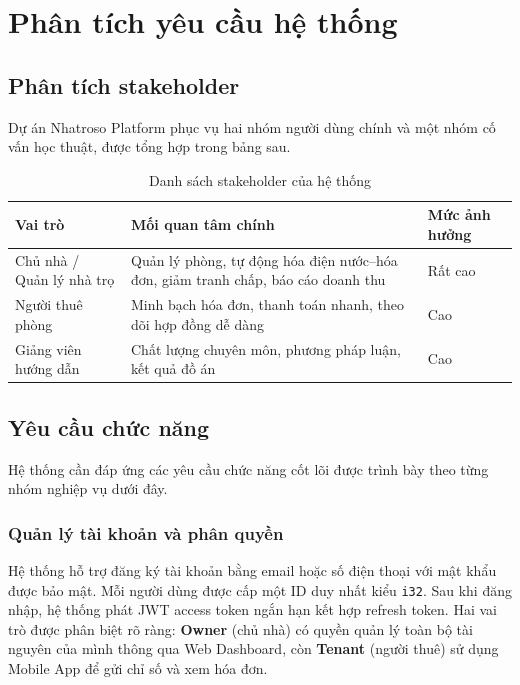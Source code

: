 \chapter{Phân tích yêu cầu hệ thống}\label{chapter_requirements}

\section{Phân tích stakeholder}

Dự án Nhatroso Platform phục vụ hai nhóm người dùng chính và một nhóm cố vấn học thuật, được tổng hợp trong bảng sau.

\begin{table}[htbp]
\centering
\caption{Danh sách stakeholder của hệ thống}
\label{tab:stakeholders}
\begin{tabularx}{\textwidth}{l>{\raggedright\arraybackslash}X>{\raggedright\arraybackslash}X}
\toprule
\textbf{Vai trò} & \textbf{Mối quan tâm chính} & \textbf{Mức ảnh hưởng} \\
\midrule
Chủ nhà / Quản lý nhà trọ & Quản lý phòng, tự động hóa điện nước--hóa đơn, giảm tranh chấp, báo cáo doanh thu & Rất cao \\[5pt]
Người thuê phòng & Minh bạch hóa đơn, thanh toán nhanh, theo dõi hợp đồng dễ dàng & Cao \\[5pt]
Giảng viên hướng dẫn & Chất lượng chuyên môn, phương pháp luận, kết quả đồ án & Cao \\
\bottomrule
\end{tabularx}
\end{table}

\section{Yêu cầu chức năng}

Hệ thống cần đáp ứng các yêu cầu chức năng cốt lõi được trình bày theo từng nhóm nghiệp vụ dưới đây.

\subsection{Quản lý tài khoản và phân quyền}

Hệ thống hỗ trợ đăng ký tài khoản bằng email hoặc số điện thoại với mật khẩu được bảo mật. Mỗi người dùng được cấp một ID duy nhất kiểu \texttt{i32}. Sau khi đăng nhập, hệ thống phát JWT access token ngắn hạn kết hợp refresh token. Hai vai trò được phân biệt rõ ràng: \textbf{Owner} (chủ nhà) có quyền quản lý toàn bộ tài nguyên của mình thông qua Web Dashboard, còn \textbf{Tenant} (người thuê) sử dụng Mobile App để gửi chỉ số và xem hóa đơn.

